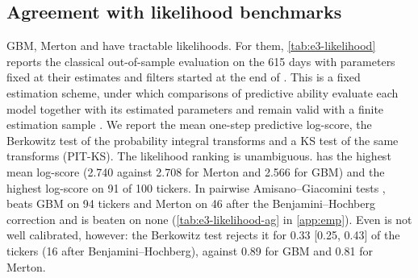 \begin{table}[tbp]
  \centering
  \caption{Per-ticker tests (E3), $L=5$: 123 real \TEST{} and 123 synthetic windows per ticker
    (headline synthetic seed), 100 tickers. \WC{}: time-block split and Driscoll--Kraay p-value;
    MMD: wild bootstrap ($B=500$). Calibrated p-values: against 1000 null p-values from
    per-ticker \GARCHt{} pairs (\cref{tab:e3-perticker-null}). Rej.\ 5\%: share of tickers with
    calibrated $p\le0.05$ [Wilson 95\% interval]; BH, BY: number of tickers rejected by the
    Benjamini--Hochberg and Benjamini--Yekutieli procedures at 5\%; Storey $\hat\pi_0$ with
    $\lambda=0.5$. Nominal columns: number of tickers with nominal $p\le0.05$ (oversized) and
    median nominal p-value.}
  \label{tab:e3-perticker}
  \small
\end{table}

\subsection{Agreement with likelihood benchmarks}\label{sec:emp-likelihood}

GBM, Merton and \GARCHt{} have tractable likelihoods. For them, \cref{tab:e3-likelihood} reports
the classical out-of-sample evaluation on the 615 \TEST{} days with parameters fixed at their
\TRAIN{} estimates and filters started at the end of \TRAIN{}. This is a fixed estimation scheme,
under which comparisons of predictive ability evaluate each model together with its estimated
parameters and remain valid with a finite estimation sample \citep{giacomini2006tests}. We
report the mean one-step predictive
log-score, the Berkowitz test of the probability integral transforms
\citep{diebold1998evaluating,berkowitz2001testing} and a KS test of the same transforms (PIT-KS).
The likelihood ranking is unambiguous. \GARCHt{} has the highest mean log-score (2.740 against
2.708 for Merton and 2.566 for GBM) and the highest log-score on 91 of 100 tickers. In pairwise
Amisano--Giacomini tests \citep{amisano2007comparing}, \GARCHt{} beats GBM on 94 tickers and
Merton on 46 after the Benjamini--Hochberg correction and is beaten on none
(\cref{tab:e3-likelihood-ag} in \cref{app:emp}). Even \GARCHt{} is not well calibrated, however:
the Berkowitz test rejects it for 0.33 [0.25, 0.43] of the tickers (16 after
Benjamini--Hochberg), against 0.89 for GBM and 0.81 for Merton.

